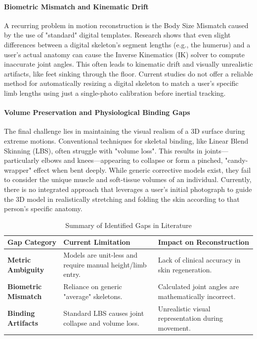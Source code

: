 \documentclass[12pt, a4paper, oneside]{report}
\begin{document}
\paragraph{Biometric Mismatch and Kinematic Drift}
A recurring problem in motion reconstruction is the Body Size Mismatch caused by the use of "standard" digital templates. Research shows that even slight differences between a digital skeleton’s segment lengths (e.g., the humerus)  and a user’s actual anatomy can cause the Inverse Kinematics (IK) solver to compute inaccurate joint angles\cite{molloy2023impact}. This often leads to kinematic drift and visually unrealistic artifacts, like feet sinking through the floor. Current studies do not offer a reliable method for automatically resizing a digital skeleton to match a user’s specific limb lengths using just a single-photo calibration before inertial tracking. 

\paragraph{Volume Preservation and Physiological Binding Gaps}
The final challenge lies in maintaining the visual realism of a 3D surface during extreme motions. Conventional techniques for skeletal binding, like Linear Blend Skinning (LBS), often struggle with "volume loss"\cite{lewis2000pose}. This results in joints—particularly elbows and knees—appearing to collapse or form a pinched, "candy-wrapper" effect when bent deeply. While generic corrective models exist, they fail to consider the unique muscle and soft-tissue volumes of an individual. Currently, there is no integrated approach that leverages a user’s initial photograph to guide the 3D model in realistically stretching and folding the skin according to that person’s specific anatomy.

\begin{table}[H]
\captionsetup{justification=raggedright,singlelinecheck=false}
\caption{Summary of Identified Gaps in Literature}
\small
\setlength{\tabcolsep}{4pt}
\renewcommand{\arraystretch}{1.2}
\begin{tabularx}{\textwidth}{|>{\raggedright\arraybackslash}p{3cm}|>{\raggedright\arraybackslash}X|>{\raggedright\arraybackslash}X|}
\hline
\textbf{Gap Category} & \textbf{Current Limitation} & \textbf{Impact on Reconstruction} \\ \hline
\textbf{Metric Ambiguity} & Models are unit-less and require manual height/limb entry. & Lack of clinical accuracy in skin regeneration. \\ \hline
\textbf{Biometric Mismatch} & Reliance on generic "average" skeletons. & Calculated joint angles are mathematically incorrect. \\ \hline
\textbf{Binding Artifacts} & Standard LBS causes joint collapse and volume loss. & Unrealistic visual representation during movement. \\ \hline
\end{tabularx}
\end{table}
\end{document}
